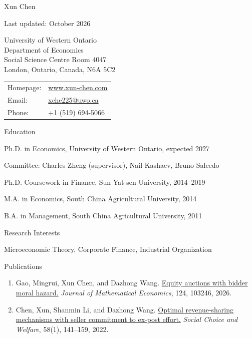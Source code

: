 \documentclass[10pt,letterpaper]{article}
\newcommand{\cvsection}[1]{%
    \par\addvspace{20pt}
    \needspace{4\baselineskip}
    {\fontsize{14.4}{18}\selectfont #1\par}
    \vspace{10pt}
}
\newenvironment{cventries}
{\begin{list}{}{%
    \setlength{\leftmargin}{1.5em}
    \setlength{\rightmargin}{0pt}
    \setlength{\itemsep}{8pt}
    \setlength{\parsep}{0pt}
    \setlength{\topsep}{0pt}
}}
{\end{list}}
\newcommand{\cvdetail}[1]{%
    \par\vspace{4pt}
    \hspace*{1.5em}%
    \parbox[t]{\dimexpr\linewidth-1.5em\relax}{#1}%
}
\begin{document}
{\fontsize{20.74}{25}\selectfont Xun Chen\par}

\vspace{12pt}
Last updated: October 2026
\vspace{15pt}

\begin{minipage}[b]{0.50\textwidth}
University of Western Ontario\\
Department of Economics\\
Social Science Centre Room 4047\\
London, Ontario, Canada, N6A 5C2
\end{minipage}\hfill
\begin{minipage}[b]{0.485\textwidth}
\begin{tabular}[b]{@{}ll@{}}
Homepage: & \href{https://www.xun-chen.com}{www.xun-chen.com}\\
Email: & \href{mailto:xche225@uwo.ca}{xche225@uwo.ca}\\
Phone: & +1 (519) 694-5066
\end{tabular}
\end{minipage}

\cvsection{Education}

\begin{cventries}

\item Ph.D. in Economics, University of Western Ontario, expected 2027
\cvdetail{Committee: Charles Zheng (supervisor), Nail Kashaev, Bruno Salcedo}

\item Ph.D. Coursework in Finance, Sun Yat-sen University, 2014--2019

\item M.A. in Economics, South China Agricultural University, 2014

\item B.A. in Management, South China Agricultural University, 2011

\end{cventries}

\cvsection{Research Interests}

Microeconomic Theory, Corporate Finance, Industrial Organization

\cvsection{Publications}

\begin{enumerate}

\item Gao, Mingrui, Xun Chen, and Dazhong Wang. \href{https://doi.org/10.1016/j.jmateco.2026.103246}{Equity auctions with bidder moral hazard.} \textit{Journal of Mathematical Economics}, 124, 103246, 2026.

\item Chen, Xun, Shanmin Li, and Dazhong Wang. \href{https://doi.org/10.1007/s00355-021-01351-w}{Optimal revenue-sharing mechanisms with seller commitment to ex-post effort.} \textit{Social Choice and Welfare}, 58(1), 141--159, 2022.

\end{enumerate}
\end{document}
